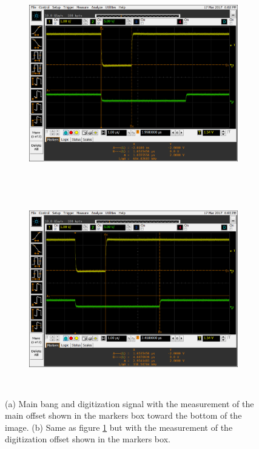 \documentclass[12pt, a4paper]{article}
\begin{document}
	\begin{figure}[t]
   		\begin{subfigure}[t]{13.5cm}
   			\includegraphics[width=13cm,height=8.5cm]{1khz_mb_1650ns_mb_offset}
   			\caption{}
   			\label{fig:var_offsets_1650} 
		\end{subfigure}

		\begin{subfigure}[t]{13.5cm}
   			\includegraphics[width=13cm,height=8.5cm]{1khz_mb_2950ns_d_offset}
   			\caption{}
   		\label{fig:var_offsets_2950}
		\end{subfigure}

	\caption{(a) Main bang and digitization signal with the measurement of the main offset shown in the markers box toward the bottom of the image. (b) Same as figure \ref{fig:var_offsets_1650} but with the measurement of the digitization offset shown in the  markers box.}
	\label{fig:variable_offsets}
	\end{figure}
\end{document}
